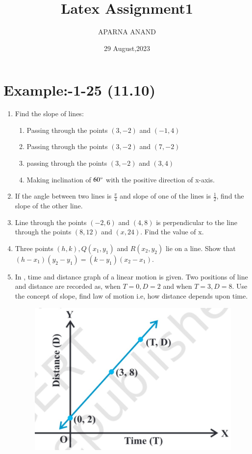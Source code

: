 \documentclass{article}
\theoremstyle{remark}
\begin{document}
\title{Latex Assignment1}
\author{APARNA ANAND}
\date{29 August,2023}
\maketitle
\section*{Example:-1-25 (11.10)}
\begin{enumerate}
\item Find the slope of lines:
\begin{enumerate}
\item  Passing through the points $(3,-2)$ and $(-1,4)$
\item  Passing through the points $(3,-2)$ and $(7,-2)$
\item  passing through the points $(3,-2)$ and $(3,4)$	
\item  Making inclination of $60\degree$ with the positive direction of x-axis.
\end{enumerate}
\item If the angle between two lines is $\frac{\pi}{4}$ and slope of one of the lines is $\frac{1}{2}$, find the slope of the other line.
\item Line through the points $(-2,6)$ and $(4,8)$ is perpendicular to the line through the points $(8,12)$ and $(x,24)$. Find the value of x.
\item Three points $(h,k), Q(x_1,y_1)$ and $R(x_2,y_2)$ lie on a line. Show that $(h-x_1)(y_2-y_1)=(k-y_1)(x_2-x_1)$.
\item In , time and distance graph of a linear motion is given. Two positions of line and distance are recorded as, when $T=0,D=2$ and when $T=3,D=8$. Use the concept of slope, find law of motion i.e, how distance depends upon time.
\begin{figure}[h]
\centering
\includegraphics[width=\columnwidth]{figs/10.9.png}

\end{figure}
\end{enumerate}
\end{document}
